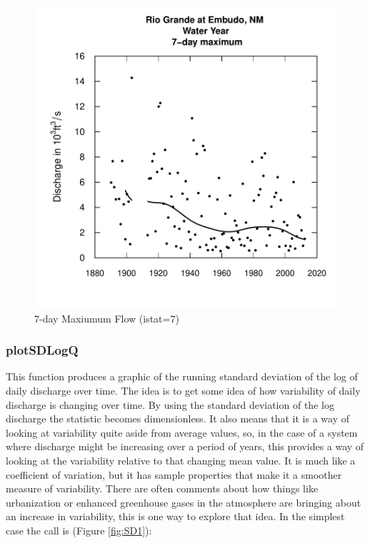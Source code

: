 \documentclass[a4paper,11pt]{article}
\begin{document}
\setlength{\abovecaptionskip}{0pt}
\begin{figure}[ht]
\begin{center}
\includegraphics{EGRET-fig1}
\end{center}
\caption{7-day Maxiumum Flow (istat=7)}
\label{fig:plotflow}
\end{figure}

\FloatBarrier

\subsubsection{plotSDLogQ}
\label{sec:plotSDLogQ}
This function produces a graphic of the running standard deviation of the log of daily discharge over time.  The idea is to get some idea of how variability of daily discharge is changing over time.  By using the standard deviation of the log discharge the statistic becomes dimensionless.  It also means that it is a way of looking at variability quite aside from average values, so, in the case of a system where discharge might be increasing over a period of years, this provides a way of looking at the variability relative to that changing mean value.  It is much like a coefficient of variation, but it has sample properties that make it a smoother measure of variability.  There are often comments about how things like urbanization or enhanced greenhouse gases in the atmosphere are bringing about an increase in variability, this is one way to explore that idea.  In the simplest case the call is (Figure \ref{fig:SD1}):
\end{document}
